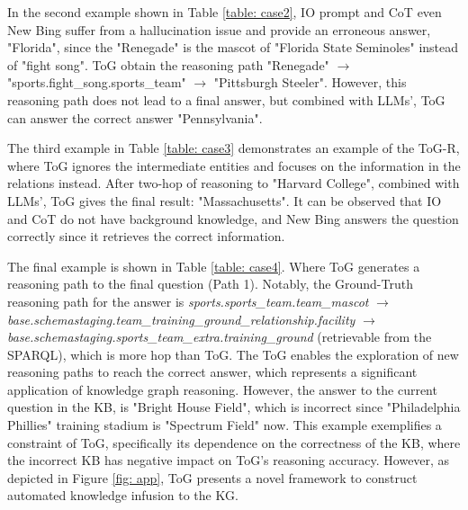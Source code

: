 \documentclass{article} %
\begin{document}
In the second example shown in Table \ref{table: case2}, IO prompt and CoT even New Bing suffer from a hallucination issue and provide an erroneous answer, "Florida", since the "Renegade" is the mascot of "Florida State Seminoles" instead of "fight song". ToG obtain the reasoning path "Renegade" $\to$ "sports.fight\_song.sports\_team" $\to$ "Pittsburgh Steeler". However, this reasoning path does not lead to a final answer, but combined with LLMs', ToG can answer the correct answer "Pennsylvania".

The third example in Table \ref{table: case3} demonstrates an example of the ToG-R, where ToG ignores the intermediate entities and focuses on the information in the relations instead. After two-hop of reasoning to "Harvard College", combined with LLMs', ToG gives the final result: "Massachusetts". It can be observed that IO and CoT do not have background knowledge, and New Bing answers the question correctly since it retrieves the correct information.

The final example is shown in Table \ref{table: case4}. Where ToG generates a reasoning path to the final question (Path 1). Notably, the Ground-Truth reasoning path for the answer is \textit{sports.sports\_team.team\_mascot} $\to$ \textit{base.schemastaging.team\_training\_ground\_relationship.facility} $\to$ \textit{base.schemastaging.sports\_team\_extra.training\_ground} (retrievable from the SPARQL), which is more hop than ToG. The ToG enables the exploration of new reasoning paths to reach the correct answer, which represents a significant application of knowledge graph reasoning. However, the answer to the current question in the KB, is "Bright House Field", which is incorrect since "Philadelphia Phillies" training stadium is "Spectrum Field" now. This example exemplifies a constraint of ToG, specifically its dependence on the correctness of the KB, where the incorrect KB has negative impact on ToG's reasoning accuracy. However, as depicted in Figure \ref{fig: app}, ToG presents a novel framework to construct automated knowledge infusion to the KG.
\end{document}
